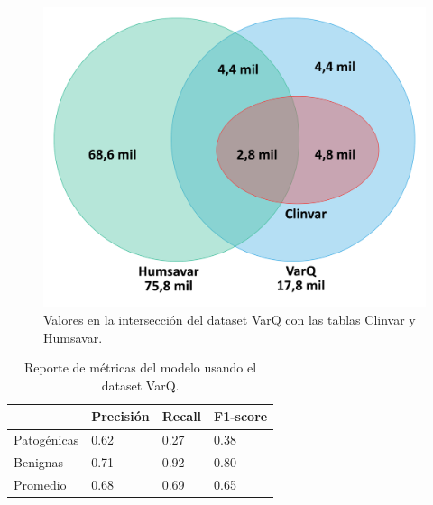 \begin{figure}[h]
    \centering
    \includegraphics[scale=0.4]{documents/latex/figures/3/interseccion_varq.png}
    \caption{Valores en la intersección del dataset VarQ con las tablas Clinvar y Humsavar. }
    \label{fig:interseccion_varq}
\end{figure}

\begin{table}[H]
\centering
\begin{tabular}{|l|l|l|l|}
\hline
              & Precisión & Recall & F1-score \\ \hline
Patogénicas   & 0.62      & 0.27   & 0.38     \\ \hline
Benignas      & 0.71      & 0.92   & 0.80     \\ \hline
Promedio      & 0.68      & 0.69   & 0.65     \\ \hline   
\end{tabular}
\caption{Reporte de métricas del modelo usando el dataset VarQ.}

\label{fig:metrics_varq}
\end{table}

